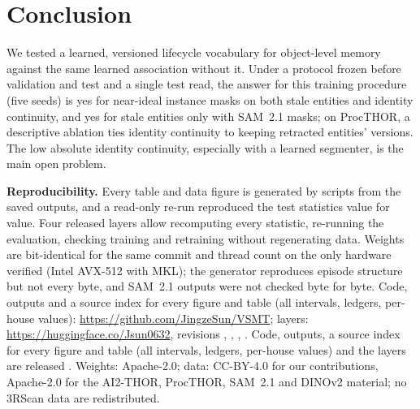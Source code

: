 \section{Conclusion}
\label{sec:conclusion}

We tested a learned, versioned lifecycle vocabulary for object-level memory against the same learned association without it.
Under a protocol frozen before validation and test and a single test read, the answer for this training procedure (five seeds) is yes for near-ideal instance masks on both stale entities and identity continuity, and yes for stale entities only with SAM~2.1 masks; on ProcTHOR, a descriptive ablation ties identity continuity to keeping retracted entities' versions.
The low absolute identity continuity, especially with a learned segmenter, is the main open problem.

\textbf{Reproducibility.}
Every table and data figure is generated by scripts from the saved outputs, and a read-only re-run reproduced the test statistics value for value.
Four released layers allow recomputing every statistic, re-running the evaluation, checking training and retraining without regenerating data.
Weights are bit-identical for the same commit and thread count on the only hardware verified (Intel AVX-512 with MKL); the generator reproduces episode structure but not every byte, and SAM~2.1 outputs were not checked byte for byte.
\iffinalversion
Code, outputs and a source index for every figure and table (all intervals, ledgers, per-house values): \url{https://github.com/JingzeSun/VSMT}; layers: \url{https://huggingface.co/Jsun0632}, revisions , , , .
\else
Code, outputs, a source index for every figure and table (all intervals, ledgers, per-house values) and the layers are released \withheld{}.
\fi
Weights: Apache-2.0; data: CC-BY-4.0 for our contributions, Apache-2.0 for the AI2-THOR, ProcTHOR, SAM~2.1 and DINOv2 material; no 3RScan data are redistributed.
